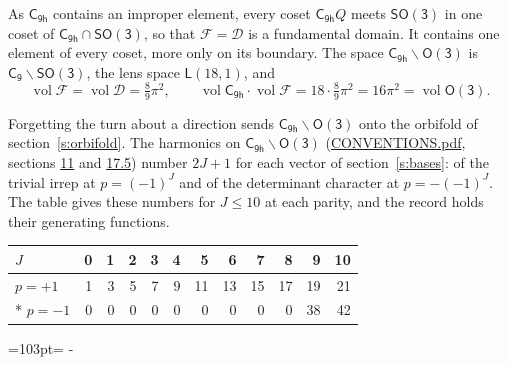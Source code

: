 \documentclass[10pt,a4paper]{article}
\newcommand{\needspace}[1]{\par\penalty-100\begingroup\dimen0=#1\relax\dimen2=\pagegoal
  \advance\dimen2-\pagetotal\ifdim\dimen0>\dimen2\relax\ifdim\dimen2>0pt\vfil\break\fi\fi
  \endgroup}
\numberwithin{equation}{section}
\newcommand{\grp}[1]{\mathsf{#1}}
\newcommand{\vol}{\operatorname{vol}}
\newcommand{\fcell}{\mathcal{D}}
\newcommand{\fdomain}{\mathcal{F}}
\newcommand{\lensspace}[2]{\mathsf{L}(#1, #2)}
\begin{document}
\leavevmode\label{n:set.fundamental}As $\grp{C_{9h}}$ contains an improper element, every coset $\grp{C_{9h}}Q$ meets \href{SO3.pdf}{$\grp{SO(3)}$} in one coset of $\grp{C_{9h}} \cap \grp{SO(3)}$, so that $\fdomain = \fcell$ is a fundamental domain. It contains one element of every coset, more only on its boundary.
\leavevmode\label{n:set.lens}The space $\grp{C_{9h}}\backslash\grp{O(3)}$ is $\grp{C_{9}}\backslash\grp{SO(3)}$, the lens space $\lensspace{18}{1}$, and
\begin{equation}\label{e:volume}\vol\fdomain = \vol\fcell = \tfrac{8}{9}\pi^2,\qquad \vol\grp{C_{9h}}\cdot\vol\fdomain = 18\cdot \tfrac{8}{9}\pi^2 = 16\pi^2 = \vol\grp{O(3)}.\end{equation}

Forgetting the turn about a direction sends $\grp{C_{9h}}\backslash\grp{O(3)}$ onto the orbifold of section~\ref{s:orbifold}.
The harmonics on $\grp{C_{9h}}\backslash\grp{O(3)}$ (\href{../../CONVENTIONS.pdf}{CONVENTIONS.pdf}, sections \href{../../CONVENTIONS.pdf\#conv.11}{11} and \href{../../CONVENTIONS.pdf\#conv.17.5}{17.5}) number $2J + 1$ for each vector of section~\ref{s:bases}: of the trivial irrep at $p = (-1)^J$ and of the determinant character at $p = -(-1)^J$. The table gives these numbers for $J \le 10$ at each parity, and the record holds their generating functions.
{\small\setlength{\tabcolsep}{4pt}\begin{longtable}{@{}lrrrrrrrrrrr@{}}\toprule
$J$ & 0 & 1 & 2 & 3 & 4 & 5 & 6 & 7 & 8 & 9 & 10\\\midrule\endhead
\bottomrule\endfoot\endlastfoot
$p = +1$ & 1 & 3 & 5 & 7 & 9 & 11 & 13 & 15 & 17 & 19 & 21\\*
$p = -1$ & 0 & 0 & 0 & 0 & 0 & 0 & 0 & 0 & 0 & 38 & 42\\
\bottomrule\end{longtable}}
\needspace{103pt}
\end{document}
